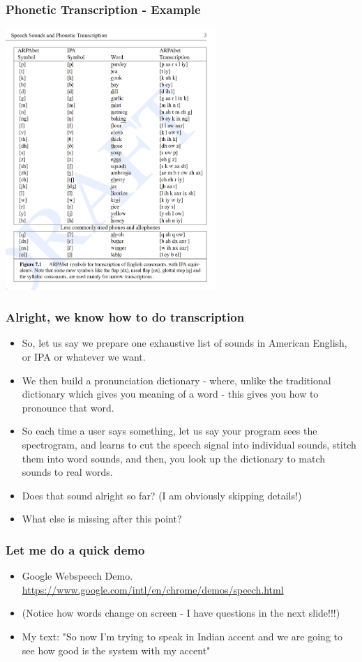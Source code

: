 \documentclass{beamer}
\begin{document}
\begin{frame}
\frametitle{Phonetic Transcription - Example}
\includegraphics[width=0.6\textwidth]{arpabet.png}
\end{frame}

\begin{frame}
\frametitle{Alright, we know how to do transcription}
\begin{itemize}
\item So, let us say we prepare one exhaustive list of sounds in American English, or IPA or whatever we want.
\item We then build a pronunciation dictionary - where, unlike the traditional dictionary which gives you meaning of a word - this gives you how to pronounce that word.
\item So each time a user says something, let us say your program sees the spectrogram, and learns to cut the speech signal into individual sounds, stitch them into word sounds,  and then, you look up the dictionary to match sounds to real words. 
\item Does that sound alright so far? (I am obviously skipping details!) \pause
\item What else is missing after this point?
\end{itemize}
\end{frame}

\begin{frame}
\frametitle{Let me do a quick demo}
\begin{itemize}
\item Google Webspeech Demo. \url{https://www.google.com/intl/en/chrome/demos/speech.html}
\item (Notice how words change on screen - I have questions in the next slide!!!)
\item My text: "So now I'm trying to speak in Indian accent and we are going to see how good is the system with my accent"
\end{itemize}
\end{frame}
\end{document}
